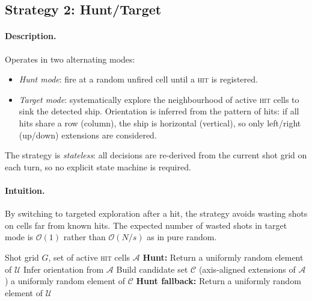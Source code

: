 \documentclass[12pt,a4paper]{article}
\newcommand{\1}{\mathbf{1}}
\newcommand{\bigo}{\mathcal{O}}
\begin{document}
\subsection{Strategy 2: Hunt/Target}

\paragraph{Description.}
Operates in two alternating modes:
\begin{itemize}[nosep]
  \item \emph{Hunt mode}: fire at a random unfired cell until a \textsc{hit} is
        registered.
  \item \emph{Target mode}: systematically explore the neighbourhood of active
        \textsc{hit} cells to sink the detected ship.  Orientation is inferred
        from the pattern of hits: if all hits share a row (column), the ship is
        horizontal (vertical), so only left/right (up/down) extensions are
        considered.
\end{itemize}
The strategy is \emph{stateless}: all decisions are re-derived from the current
shot grid on each turn, so no explicit state machine is required.

\paragraph{Intuition.}
By switching to targeted exploration after a hit, the strategy avoids wasting
shots on cells far from known hits.  The expected number of wasted shots in
target mode is $\bigo(1)$ rather than $\bigo(N/s)$ as in pure random.

\begin{algorithm}[H]
  \caption{Hunt/Target Strategy}
  \begin{algorithmic}[1]
    \Require Shot grid $G$, set of active \textsc{hit} cells $\mathcal{A}$
      \State \textbf{Hunt:} Return a uniformly random element of $\mathcal{U}$
    \Else
      \State Infer orientation from $\mathcal{A}$
      \State Build candidate set $\mathcal{C}$ (axis-aligned extensions of $\mathcal{A}$)
        \State \Return a uniformly random element of $\mathcal{C}$
      \Else
        \State \textbf{Hunt fallback:} Return a uniformly random element of $\mathcal{U}$
      \EndIf
    \EndIf
  \end{algorithmic}
\end{algorithm}
\end{document}

